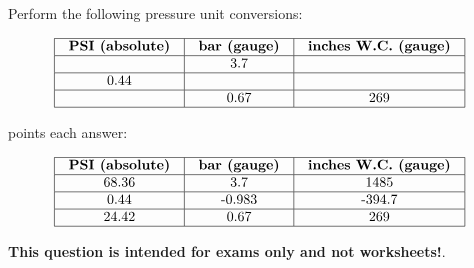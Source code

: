 

Perform the following pressure unit conversions:


$$\vbox{\offinterlineskip
\halign{\strut
\vrule \quad\hfil # \ \hfil & 
\vrule \quad\hfil # \ \hfil & 
\vrule \quad\hfil # \ \hfil \vrule \cr
\noalign{\hrule}
%
{\bf PSI (absolute)} & {\bf bar (gauge)} & {\bf inches W.C. (gauge)} \cr
%
\noalign{\hrule}
%
 & 3.7 &  \cr
%
\noalign{\hrule}
%
0.44 &  &  \cr
%
\noalign{\hrule}
%
 & 0.67 & 269 \cr
%
\noalign{\hrule}
} %
}$$ %







 points each answer:

\vskip 10pt


$$\vbox{\offinterlineskip
\halign{\strut
\vrule \quad\hfil # \ \hfil & 
\vrule \quad\hfil # \ \hfil & 
\vrule \quad\hfil # \ \hfil \vrule \cr
\noalign{\hrule}
%
{\bf PSI (absolute)} & {\bf bar (gauge)} & {\bf inches W.C. (gauge)} \cr
%
\noalign{\hrule}
%
68.36 & 3.7 & 1485 \cr
%
\noalign{\hrule}
%
0.44 & -0.983  & -394.7 \cr
%
\noalign{\hrule}
%
24.42 & 0.67 & 269 \cr
%
\noalign{\hrule}
} %
}$$ %







{\bf This question is intended for exams only and not worksheets!}.




